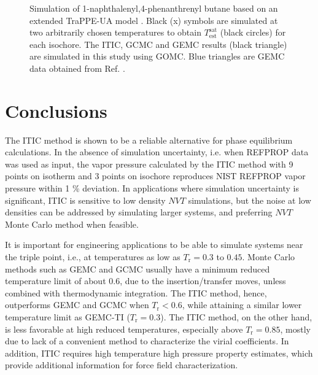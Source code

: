 \documentclass[5p,times]{elsarticle}
\begin{document}
\begin{figure}[]
\centering
{}\label{cc}
\label{aa}
\label{bb}
\caption{
Simulation of 1-naphthalenyl,4-phenanthrenyl butane based on an extended TraPPE-UA model \cite{Yiannourakou2018}. Black (x) symbols are simulated at two arbitrarily chosen temperatures to obtain $T_\mathrm{est}^\mathrm{sat}$ (black circles) for each isochore. The ITIC, GCMC and GEMC results (black triangle) are simulated in this study using GOMC. Blue triangles are GEMC data obtained from Ref. \cite{Yiannourakou2018}.
}
\label{fig:Ex_Sim_TraPPE-1p4nB}
\end{figure}

\section{Conclusions} \label{sec:conclusion} 
The ITIC method is shown to be a reliable alternative for phase equilibrium calculations. In the absence of simulation uncertainty, i.e. when REFPROP data was used as input, the vapor pressure calculated by the ITIC method with 9 points on isotherm and 3 points on isochore reproduces NIST REFPROP vapor pressure within 1 \% deviation. In applications where simulation uncertainty is significant, ITIC is sensitive to low density $NVT$ simulations, but the noise at low densities can be addressed by simulating larger systems, and preferring $NVT$ Monte Carlo method when feasible.

It is important for engineering applications to be able to simulate systems near the triple point, i.e., at temperatures as low as $T_\mathrm{r} = 0.3$ to $0.45$.  Monte Carlo methods such as GEMC and GCMC usually have a minimum reduced temperature limit of about 0.6, due to the insertion/transfer moves, unless combined with thermodynamic integration. The ITIC method, hence, outperforms GEMC and GCMC when $T_\mathrm{r}<0.6$, while attaining a similar lower temperature limit as GEMC-TI ($T_\mathrm{r} = 0.3$). The ITIC method, on the other hand, is less favorable at high reduced temperatures, especially above $T_\mathrm{r}=0.85$, mostly due to lack of a convenient method to characterize the virial coefficients. In addition, ITIC requires high temperature high pressure property estimates, which provide additional information for force field characterization.
\end{document}
